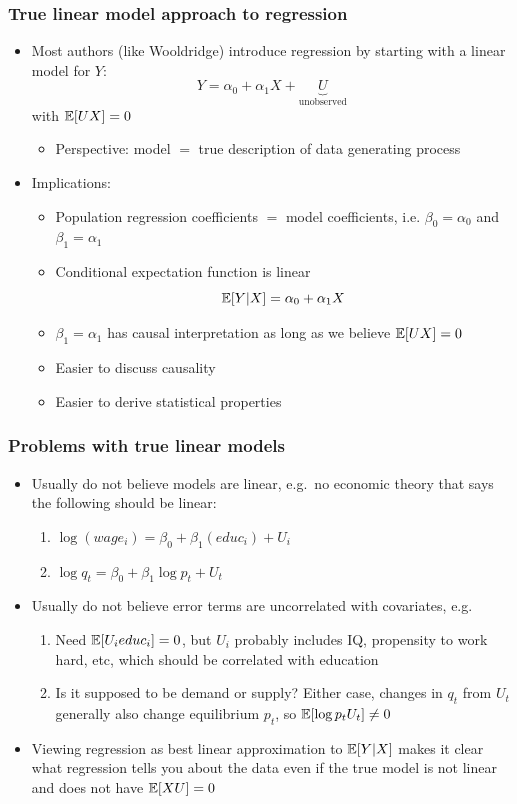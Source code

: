 \begin{frame}[allowframebreaks]
  \frametitle{True linear model approach to regression}
  \begin{itemize}
  \item Most authors (like Wooldridge) introduce regression by
    starting with a linear model for $Y$:
    \[ Y = \alpha_0 + \alpha_1 X + \underbrace{U}_{\text{unobserved}} \] 
    with $\mathbb{E}[U X] = 0$
    \begin{itemize}
    \item Perspective: model $=$ true description of data generating
      process 
    \end{itemize}
  \item Implications:
    \begin{itemize}
    \item Population regression coefficients $=$ model coefficients,
      i.e. $\beta_0 = \alpha_0$ and $\beta_1 = \alpha_1$
    \item Conditional expectation function is linear 
      \[ \mathbb{E}[Y|X] = \alpha_0 + \alpha_1 X \]
    \item $\beta_1=\alpha_1$ has causal interpretation as long as we
      believe $\mathbb{E}[U X] = 0$
    \item Easier to discuss causality
    \item Easier to derive statistical properties
    \end{itemize}
  \end{itemize}
\end{frame}

\begin{frame}[allowframebreaks]
  \frametitle{Problems with true linear models}
  \begin{itemize}
  \item Usually do not believe models are linear, e.g.\ no economic
    theory that says the following should be linear:
    \begin{enumerate}
    \item $\log (wage_i) = \beta_0 + \beta_1 (educ_i) + U_i$
    \item $\log q_t = \beta_0 + \beta_1 \log p_t + U_t$
    \end{enumerate}
  \item Usually do not believe error terms are uncorrelated with
    covariates, e.g.\
    \begin{enumerate}
    \item Need $\mathbb{E}[U_i educ_i]=0$, but $U_i$ probably includes IQ,
      propensity to work hard, etc, which should be correlated with
      education 
    \item Is it supposed to be demand or supply? Either case, changes
      in $q_t$ from $U_t$ generally also change equilibrium $p_t$, so
      $\mathbb{E}[\log p_t U_t ] \neq 0$
    \end{enumerate}
  \item Viewing regression as best linear approximation to $\mathbb{E}[Y|X]$
    makes it clear what regression tells you about the data even if
    the true model is not linear and does not have $\mathbb{E}[XU]=0$
  \end{itemize}
\end{frame}


